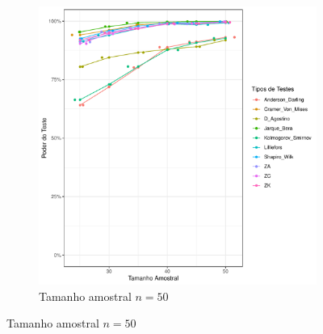 \documentclass[a4paper,11pt]{article} %
\begin{document}
\begin{figure}[H]
\begin{subfigure}[b]{0.45\textwidth}
        \includegraphics[width=\textwidth]{Distribuição Cauchy/Poder do Teste/poder_teste_cauchy_50.pdf}
        \caption{Tamanho amostral \(n = 50\)}
        \label{fig:cauchy_poder_50}
    \end{subfigure}
    

\end{figure}
\end{document}
